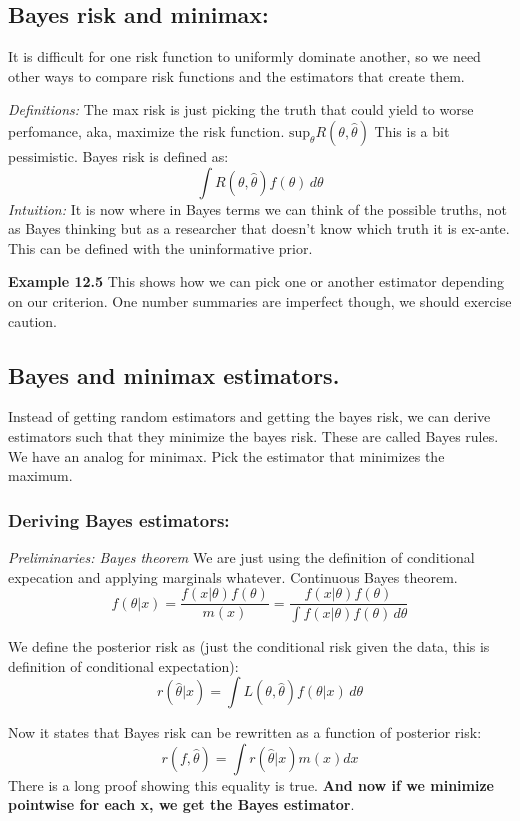 \documentclass{article}
\begin{document}
\subsection*{Bayes risk and minimax:}
It is difficult for one risk function to uniformly dominate another, so we need other ways to compare risk functions and the estimators that create them.

\textit{Definitions:}
The max risk is just picking the truth that could yield to worse perfomance, aka, maximize the risk function. $\textrm{sup}_\theta R(\theta,\hat{\theta})$ This is a 
bit pessimistic.
Bayes risk is defined as: $$ \int R(\theta,\hat{\theta}) f(\theta)\,d\theta  $$
\textit{Intuition:} It is now where in Bayes terms we can think of the possible truths, not as Bayes thinking but as a researcher that 
doesn't know which truth it is ex-ante. This can be defined with the uninformative prior. 

\textbf{Example 12.5}
This shows how we can pick one or another estimator depending on our criterion. One number summaries are imperfect though,
we should exercise caution. 

\subsection*{Bayes and minimax estimators.}
Instead of getting random estimators and getting the bayes risk, we can derive estimators such that they minimize
the bayes risk. These are called Bayes rules. We have an analog for minimax. Pick the estimator 
that minimizes the maximum.

\subsubsection{Deriving Bayes estimators:}
\textit{Preliminaries: Bayes theorem}
We are just using the definition of conditional expecation and applying marginals whatever. Continuous Bayes theorem.
$$f(\theta|x) = \frac{f(x|\theta)f(\theta)}{m(x)} = \frac{f(x|\theta)f(\theta)}{\int f(x|\theta)f(\theta) \, d\theta }$$ 

We define the posterior risk as (just the conditional risk given the data, this is definition of conditional expectation): $$ r(\hat{\theta}| x) = \int L(\theta,\hat{\theta})f(\theta|x)\,d\theta $$

Now it states that Bayes risk can be rewritten as a function of posterior risk: $$r(f,\hat{\theta}) = \int r(\hat{\theta}|x) m(x) dx$$
There is a long proof showing this equality is true.
\textbf{And now if we minimize pointwise for each x, we get the Bayes estimator}.
\end{document}
